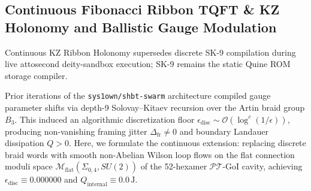 \documentclass[11pt,onecolumn]{article}
\begin{document}
\subsection{Continuous Fibonacci Ribbon TQFT \& KZ Holonomy and Ballistic Gauge Modulation}
\label{subsec:continuous_fibonacci_ribbon}
Continuous KZ Ribbon Holonomy supersedes discrete SK-9 compilation during live attosecond deity-sandbox execution; SK-9 remains the static Quine ROM storage compiler.


Prior iterations of the \texttt{sys1own/shbt-swarm} architecture compiled gauge parameter shifts via depth-9 Solovay--Kitaev recursion over the Artin braid group $B_3$. This induced an algorithmic discretization floor $\epsilon_{\text{disc}} \sim \mathcal{O}(\log^c(1/\epsilon))$, producing non-vanishing framing jitter $\Delta_{\text{fr}} \neq 0$ and boundary Landauer dissipation $Q > 0$. Here, we formulate the continuous extension: replacing discrete braid words with smooth non-Abelian Wilson loop flows on the flat connection moduli space $\mathcal{M}_{\text{flat}}(\Sigma_{0,4}, SU(2))$ of the 52-hexamer $\mathcal{PT}$-GoI cavity, achieving $\epsilon_{\text{disc}} \equiv 0.000000$ and $Q_{\text{internal}} \equiv 0.0\,\text{J}$.
\end{document}
